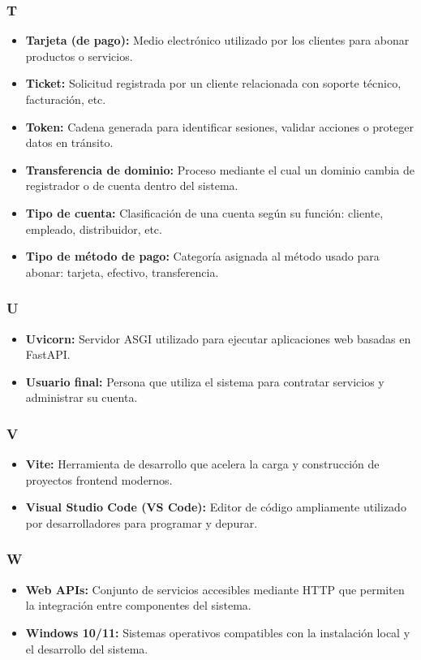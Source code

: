 \subsubsection*{T}
\begin{itemize}
\item \textbf{Tarjeta (de pago):} Medio electrónico utilizado por los clientes para abonar productos o servicios.
\item \textbf{Ticket:} Solicitud registrada por un cliente relacionada con soporte técnico, facturación, etc.
\item \textbf{Token:} Cadena generada para identificar sesiones, validar acciones o proteger datos en tránsito.
\item \textbf{Transferencia de dominio:} Proceso mediante el cual un dominio cambia de registrador o de cuenta dentro del sistema.
\item \textbf{Tipo de cuenta:} Clasificación de una cuenta según su función: cliente, empleado, distribuidor, etc.
\item \textbf{Tipo de método de pago:} Categoría asignada al método usado para abonar: tarjeta, efectivo, transferencia.
\end{itemize}

\subsubsection*{U}
\begin{itemize}
\item \textbf{Uvicorn:} Servidor ASGI utilizado para ejecutar aplicaciones web basadas en FastAPI.
\item \textbf{Usuario final:} Persona que utiliza el sistema para contratar servicios y administrar su cuenta.
\end{itemize}

\subsubsection*{V}
\begin{itemize}
\item \textbf{Vite:} Herramienta de desarrollo que acelera la carga y construcción de proyectos frontend modernos.
\item \textbf{Visual Studio Code (VS Code):} Editor de código ampliamente utilizado por desarrolladores para programar y depurar.
\end{itemize}

\subsubsection*{W}
\begin{itemize}
\item \textbf{Web APIs:} Conjunto de servicios accesibles mediante HTTP que permiten la integración entre componentes del sistema.
\item \textbf{Windows 10/11:} Sistemas operativos compatibles con la instalación local y el desarrollo del sistema.
\end{itemize}

